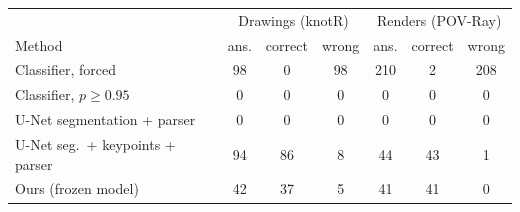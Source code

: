 \begin{tabular}{@{}lcccccc@{}}
\toprule
 & \multicolumn{3}{c}{Drawings (knotR)} & \multicolumn{3}{c}{Renders (POV-Ray)} \\
Method & ans. & correct & wrong & ans. & correct & wrong \\
\midrule
Classifier, forced & 98 & 0 & 98 & 210 & 2 & 208 \\
Classifier, $p\ge0.95$ & 0 & 0 & 0 & 0 & 0 & 0 \\
U-Net segmentation + parser & 0 & 0 & 0 & 0 & 0 & 0 \\
U-Net seg.\ + keypoints + parser & 94 & 86 & 8 & 44 & 43 & 1 \\
Ours (frozen model) & 42 & 37 & 5 & 41 & 41 & 0 \\
\bottomrule
\end{tabular}
